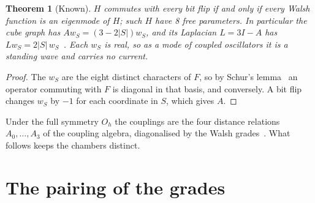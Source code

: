 \documentclass[twocolumn]{iopjournal}
\newtheorem{theorem}{Theorem}
\theoremstyle{definition}
\theoremstyle{remark}
\begin{document}
\begin{theorem}[Known]
\label{thm:walsh}
$H$ commutes with every bit flip if and only if every Walsh function is
an eigenmode of $H$; such $H$ have 8 free parameters. In particular the
cube graph has $Aw_S = (3 - 2\lvert S\rvert)w_S$, and its Laplacian $L =
3I - A$ has $Lw_S = 2\lvert S\rvert\,w_S$~\cite{ODonnell2014}. Each $w_S$
is real, so as a mode of coupled oscillators it is a standing wave and
carries no current.
\end{theorem}

\begin{proof}
The $w_S$ are the eight distinct characters of $F$, so by Schur's
lemma~\cite{Serre1977} an operator commuting with $F$ is diagonal in that
basis, and conversely. A bit flip changes $w_S$ by $-1$ for each
coordinate in $S$, which gives $A$.
\end{proof}

Under the full symmetry $O_h$ the couplings are the four distance
relations $A_0, \dots, A_3$ of the coupling algebra, diagonalised by the
Walsh grades~\cite{NelsonCoupling}. What follows keeps the chambers
distinct.


\section{The pairing of the grades}
\end{document}
